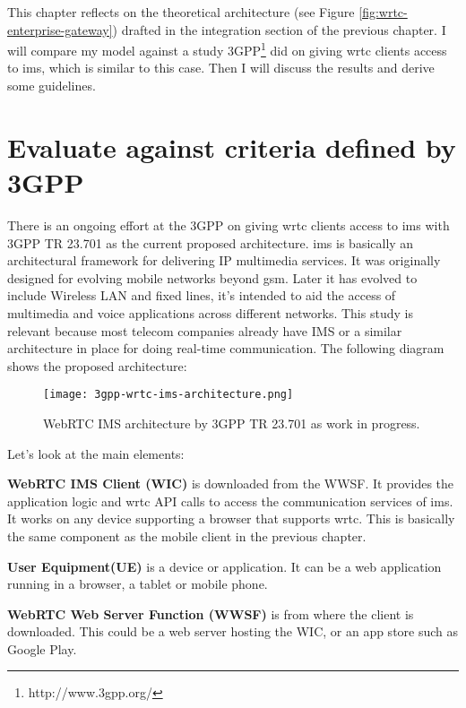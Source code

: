
This chapter reflects on the theoretical architecture (see Figure \ref{fig:wrtc-enterprise-gateway}) drafted in the integration section of the previous chapter. I will compare my model against a study 3GPP\footnote{http://www.3gpp.org/} did on giving \gls{wrtc} clients access to \gls{ims}, which is similar to this case. Then I will discuss the results and derive some guidelines.


\section{Evaluate against criteria defined by 3GPP}
There is an ongoing effort at the 3GPP on giving \gls{wrtc} clients access to \gls{ims} with 3GPP TR 23.701\cite{3gpp-wrtc-access-ims} as the current proposed architecture. \gls{ims} is basically an architectural framework for delivering IP multimedia services. It was originally designed for evolving mobile networks beyond \gls{gsm}. Later it has evolved to include Wireless LAN and fixed lines, it's intended to aid the access of multimedia and voice applications across different networks. This study is relevant because most telecom companies already have IMS or a similar architecture in place for doing real-time communication. The following diagram shows the proposed architecture:

\begin{figure}[here]
\centerline{\texttt{[image: 3gpp-wrtc-ims-architecture.png]}}
\caption{WebRTC IMS architecture by 3GPP TR 23.701 as work in progress.}
\label{fig:wrtc-ims-architecture}
\end{figure}

Let's look at the main elements:

\textbf{WebRTC IMS Client (WIC)}
is downloaded from the WWSF. It provides the application logic and \gls{wrtc} API calls to access the communication services of \gls{ims}. It works on any device supporting a browser that supports \gls{wrtc}. This is basically the same component as the mobile client in the previous chapter.

\textbf{User Equipment(UE)}
is a device or application. It can be a web application running in a browser, a tablet or mobile phone.

\textbf{WebRTC Web Server Function (WWSF)}
is from where the client is downloaded. This could be a web server hosting the WIC, or an app store such as Google Play.

